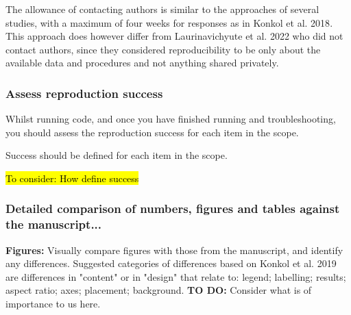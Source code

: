 The allowance of contacting authors is similar to the approaches of several studies,\autocite{krafczyk_learning_2021,wood_push_2018,berkeley_initiative_for_transparency_in_the_social_sciences_guide_2022,hardwicke_analytic_2021,konkol_computational_2019} with a maximum of four weeks for responses as in Konkol et al. 2018\autocite{konkol_computational_2019}. This approach does however differ from Laurinavichyute et al. 2022\autocite{laurinavichyute_share_2022} who did not contact authors, since they considered reproducibility to be only about the available data and procedures and not anything shared privately.\autocite{laurinavichyute_share_2022}

\subsubsection{Assess reproduction success}
\timeyes

Whilst running code, and once you have finished running and troubleshooting, you should assess the reproduction success for each item in the scope.

Success should be defined for each item in the scope.


\hl{To consider: How define success}

\subsubsection{Detailed comparison of numbers, figures and tables against the manuscript...}

\textbf{Figures:} Visually compare figures with those from the manuscript, and identify any differences. Suggested categories of differences based on Konkol et al. 2019\autocite{konkol_computational_2019} are differences in "content" or in "design" that relate to: legend; labelling; results; aspect ratio; axes; placement; background.\autocite{konkol_computational_2019} \textbf{TO DO:} Consider what is of importance to us here.

